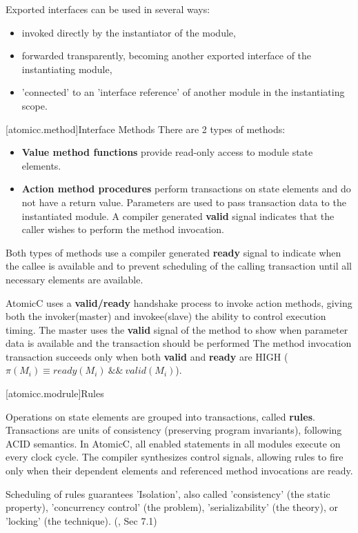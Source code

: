 Exported interfaces can be used in several ways:
\begin{itemize}
\item invoked directly by the instantiator of the module,
\item forwarded transparently, becoming another exported interface of the instantiating module,
\item 'connected' to an 'interface reference' of another module in the instantiating scope.
\end{itemize}

[atomicc.method]{Interface Methods}
There are 2 types of methods:
\begin{itemize}
\item \textbf{Value method functions} provide read-only access to module state elements.
\item \textbf{Action method procedures} perform transactions on state elements
and do not have a return value.
Parameters are used to pass transaction data to the instantiated module.
A compiler generated
\textbf{valid} signal indicates that the caller wishes to perform the method invocation.
\end{itemize}

Both types of methods use a compiler generated \textbf{ready} signal
to indicate when the callee is available and
to prevent scheduling of the calling transaction until all necessary elements are
available.

AtomicC uses a \textbf{valid/ready} handshake process\cite{Fletcher2009, AXISpec} to invoke action methods,
giving both the invoker(master) and invokee(slave) the ability to control execution timing.
The master uses the \textbf{valid} signal
of the method to show when parameter data is available and the transaction should be performed
The method invocation transaction succeeds only when
both \textbf{valid} and \textbf{ready} are HIGH ($\pi(M_{i}) \equiv ready(M_{i})\ \&\&\ valid(M_{i})$).

[atomicc.modrule]{Rules}

Operations on state elements are grouped into transactions, called \textbf{rules}.
Transactions are units of consistency (preserving program invariants), following ACID semantics.
In AtomicC, all enabled statements in all modules execute on every clock cycle.
The compiler synthesizes control signals, allowing rules to fire
only when their dependent elements and referenced method invocations are ready.

Scheduling of rules guarantees 'Isolation',
also called 'consistency' (the static property), 'concurrency control'
(the problem), 'serializability' (the theory), or 'locking' (the technique). (\cite{GrayR93}, Sec 7.1)

